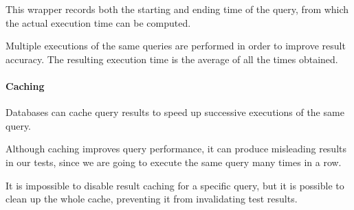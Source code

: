         This wrapper records both the starting and ending time of the query, from which the actual execution time can be computed.
        
        Multiple executions of the same queries are performed in order to improve result accuracy.
        The resulting execution time is the average of all the times obtained.
        
    \paragraph{Caching}
        Databases can cache query results to speed up successive executions of the same query.
        
        Although caching improves query performance, it can produce misleading results in our tests, since we are going to execute the same query many times in a row.
        
        It is impossible to disable result caching for a specific query, but it is possible to clean up the whole cache, preventing it from invalidating test results.
        
